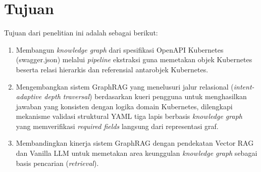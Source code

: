 \section{Tujuan}
Tujuan dari penelitian ini adalah sebagai berikut:
\begin{enumerate}
    \item Membangun \textit{knowledge graph} dari spesifikasi OpenAPI Kubernetes (swagger.json) melalui \textit{pipeline} ekstraksi guna memetakan objek Kubernetes beserta relasi hierarkis dan referensial antarobjek Kubernetes.
    
    \item Mengembangkan sistem GraphRAG yang menelusuri jalur relasional (\textit{intent-adaptive depth traversal}) berdasarkan kueri pengguna untuk menghasilkan jawaban yang konsisten dengan logika domain Kubernetes, dilengkapi mekanisme validasi struktural YAML tiga lapis berbasis \textit{knowledge graph} yang memverifikasi \textit{required fields} langsung dari representasi graf.

    \item Membandingkan kinerja sistem GraphRAG dengan pendekatan Vector RAG dan Vanilla LLM untuk memetakan area keunggulan \textit{knowledge graph} sebagai basis pencarian (\textit{retrieval}).
\end{enumerate}

